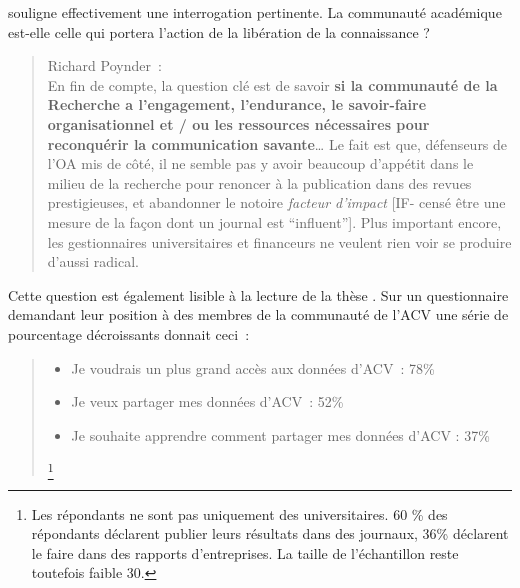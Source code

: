 \citeauthor{moody_open_2016} souligne effectivement une interrogation pertinente.
La communauté académique est-elle celle qui portera l'action de la libération de la connaissance ?

\blockcquote{moody_open_2016}{
Richard Poynder~:\\
En fin de compte, la question clé est de savoir \textbf{si la communauté de la Recherche a l'engagement, l'endurance, le savoir-faire organisationnel et / ou les ressources nécessaires pour reconquérir la communication savante}\ldots
Le fait est que, défenseurs de l'OA mis de côté, il ne semble pas y avoir beaucoup d'appétit dans le milieu de la recherche pour renoncer à la publication dans des revues prestigieuses, et abandonner le notoire \emph{facteur d'impact} [IF- censé être une mesure de la façon dont un journal est ``influent''].
Plus important encore, les gestionnaires universitaires et financeurs ne veulent rien voir se produire d'aussi radical.
}

Cette question est également lisible à la lecture de la thèse .
Sur un questionnaire demandant leur position à des membres de la communauté de l'\gls{ACV} une série de pourcentage décroissants donnait ceci~:
~\blockcquote[traduction d'un extrait de Table 4-11 Survey Results – Attitudes about Information Sharing Q18. Select attitudes toward information sharing that apply to you (Select all that apply)]{sayan_contribution_2011}{
\begin{itemize}
\item Je voudrais un plus grand accès aux données d'ACV~: 78\%
\item Je veux partager mes données d'ACV~: 52\%
\item Je souhaite apprendre comment partager mes données d'ACV : 37\%
\end{itemize}\footnote{Les répondants ne sont pas uniquement des universitaires. 60 \% des répondants déclarent publier leurs résultats dans des journaux, 36\% déclarent le faire dans des rapports d'entreprises. La taille de l'échantillon reste toutefois faible 30.}
}.

